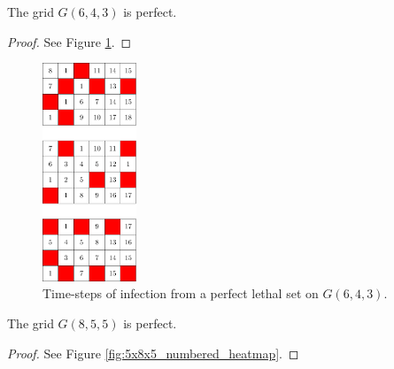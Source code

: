 \begin{con}
\label{con:6x4x3}
The grid $G(6,4,3)$ is perfect.
\end{con}

\begin{proof}
See Figure \ref{fig:4x6x3_numbered_heatmap}.
\end{proof}

\begin{figure}[H]
\centering
\includegraphics[width=0.25\textwidth]{figures/A/4x6x3_numbered_heatmap.pdf}
\caption{Time-steps of infection from a perfect lethal set on $G(6,4,3)$.}
\label{fig:4x6x3_numbered_heatmap}
\end{figure}

\newpage




\begin{con}
\label{con:8x5x5}
The grid $G(8,5,5)$ is perfect.
\end{con}

\begin{proof}
See Figure \ref{fig:5x8x5_numbered_heatmap}.
\end{proof}

